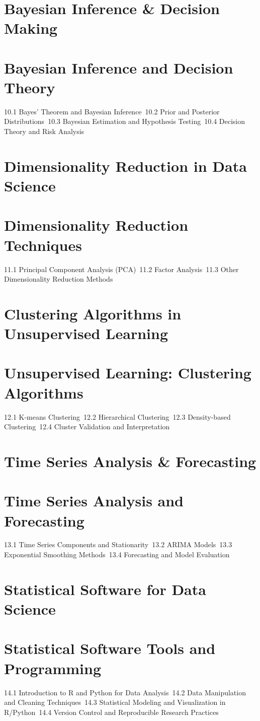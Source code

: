 \section{Bayesian Inference \& Decision Making}
\section{Bayesian Inference and Decision Theory}
10.1 Bayes' Theorem and Bayesian Inference\
10.2 Prior and Posterior Distributions\
10.3 Bayesian Estimation and Hypothesis Testing\
10.4 Decision Theory and Risk Analysis\
\section{Dimensionality Reduction in Data Science}
\section{Dimensionality Reduction Techniques}
11.1 Principal Component Analysis (PCA)\
11.2 Factor Analysis\
11.3 Other Dimensionality Reduction Methods\
\section{Clustering Algorithms in Unsupervised Learning}
\section{Unsupervised Learning: Clustering Algorithms}
12.1 K-means Clustering\
12.2 Hierarchical Clustering\
12.3 Density-based Clustering\
12.4 Cluster Validation and Interpretation\
\section{Time Series Analysis \& Forecasting}
\section{Time Series Analysis and Forecasting}
13.1 Time Series Components and Stationarity\
13.2 ARIMA Models\
13.3 Exponential Smoothing Methods\
13.4 Forecasting and Model Evaluation\
\section{Statistical Software for Data Science}
\section{Statistical Software Tools and Programming}
14.1 Introduction to R and Python for Data Analysis\
14.2 Data Manipulation and Cleaning Techniques\
14.3 Statistical Modeling and Visualization in R/Python\
14.4 Version Control and Reproducible Research Practices\
